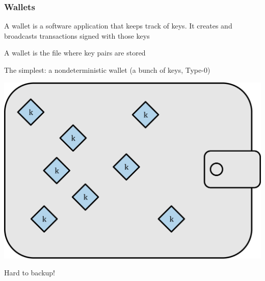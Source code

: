 \documentclass[11pt]{beamer}  %
\begin{document}
\begin{frame}
  \frametitle{Wallets}

  \begin{greenbox}{}
    A wallet is a software \alert{application} that keeps track of keys.
    It creates and broadcasts transactions signed with those keys
  \end{greenbox}

  \bigskip

  \begin{greenbox}{}
    A wallet is the \alert{file} where key pairs are stored
  \end{greenbox}

  \bigskip
  \begin{greenbox}{The simplest: a nondeterministic wallet (a bunch of keys, Type-0)}
    \begin{center}
      \includegraphics[scale=0.45,clip=false]{pictures/mbc2_0501.png}
    \end{center}
    Hard to backup!
  \end{greenbox}

\end{frame}
\end{document}
